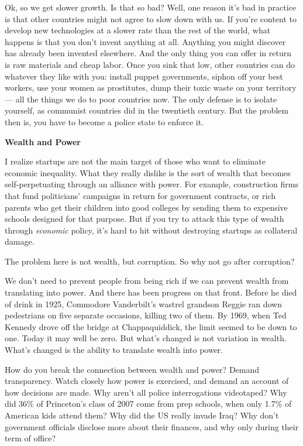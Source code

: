 Ok, so we get slower growth. Is that so bad? Well, one reason it's bad
in practice is that other countries might not agree to slow down with
us. If you're content to develop new technologies at a slower rate than
the rest of the world, what happens is that you don't invent anything at
all. Anything you might discover has already been invented elsewhere.
And the only thing you can offer in return is raw materials and cheap
labor. Once you sink that low, other countries can do whatever they like
with you: install puppet governments, siphon off your best workers, use
your women as prostitutes, dump their toxic waste on your territory ---
all the things we do to poor countries now. The only defense is to
isolate yourself, as communist countries did in the twentieth century.
But the problem then is, you have to become a police state to enforce
it.

\textbf{Wealth and Power}

I realize startups are not the main target of those who want to
eliminate economic inequality. What they really dislike is the sort of
wealth that becomes self-perpetuating through an alliance with power.
For example, construction firms that fund politicians' campaigns in
return for government contracts, or rich parents who get their children
into good colleges by sending them to expensive schools designed for
that purpose. But if you try to attack this type of wealth through
\emph{economic} policy, it's hard to hit without destroying startups as
collateral damage.

The problem here is not wealth, but corruption. So why not go after
corruption?

We don't need to prevent people from being rich if we can prevent wealth
from translating into power. And there has been progress on that front.
Before he died of drink in 1925, Commodore Vanderbilt's wastrel grandson
Reggie ran down pedestrians on five separate occasions, killing two of
them. By 1969, when Ted Kennedy drove off the bridge at Chappaquiddick,
the limit seemed to be down to one. Today it may well be zero. But
what's changed is not variation in wealth. What's changed is the ability
to translate wealth into power.

How do you break the connection between wealth and power? Demand
transparency. Watch closely how power is exercised, and demand an
account of how decisions are made. Why aren't all police interrogations
videotaped? Why did 36\% of Princeton's class of 2007 come from prep
schools, when only 1.7\% of American kids attend them? Why did the US
really invade Iraq? Why don't government officials disclose more about
their finances, and why only during their term of office?

